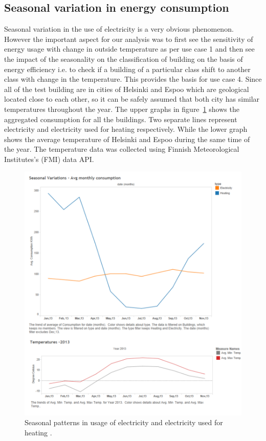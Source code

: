 \subsection{Seasonal variation in energy consumption}
Seasonal variation in the use of electricity is a very obvious phenomenon. However the important aspect for our analysis was to first see the sensitivity of energy usage with change in outside temperature as per use case 1 and then see the impact of the seasonality on the classification of building on the basis of energy efficiency i.e. to check if a building of a particular class shift to another class with change in the temperature. This provides the basis for use case 4. Since all of the test building are in cities of Helsinki and Espoo which are geological located close to each other, so it can be safely assumed that both city has similar temperatures throughout the year. The upper graphs in figure~\ref{fig:season} shows the aggregated consumption for all the buildings. Two separate lines represent electricity and electricity used for heating respectively. While the lower graph shows the average temperature of Helsinki and Espoo during the same time of the year. The temperature data was collected using Finnish Meteorological Institutes's (FMI) data API.       
 
\begin{figure}[!ht]
    \begin{center}
      \includegraphics[scale = 0.7]{images/season.pdf}
      \caption{Seasonal patterns in usage of electricity and electricity used for heating .}
      \label{fig:season}
    \end{center}
  \end{figure} 

